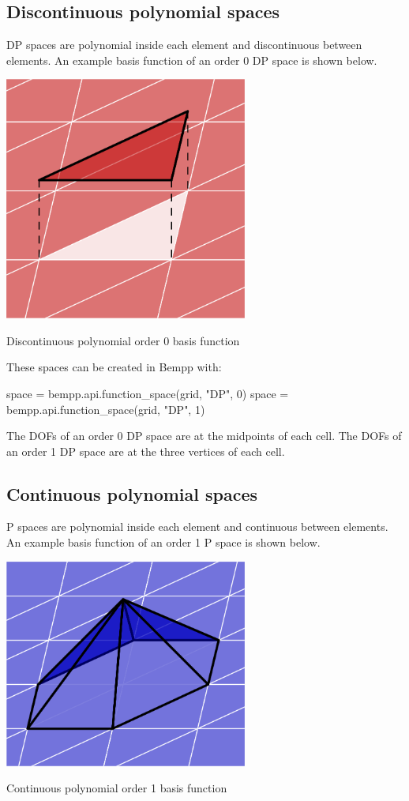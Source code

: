 \documentclass[a4paper]{book}
\begin{document}
\subsection{ Discontinuous polynomial spaces}DP spaces are polynomial inside each element and discontinuous between elements.
An example basis function of an order 0 DP space is shown below.

\begin{center}
\includegraphics[width=0.6\textwidth]{../img/dp0.png}

\footnotesize{Discontinuous polynomial order 0 basis function}\end{center}

These spaces can be created in Bempp with:

\begin{python}
space = bempp.api.function_space(grid, "DP", 0)
space = bempp.api.function_space(grid, "DP", 1)
\end{python}

The DOFs of an order 0 DP space are at the midpoints of each cell.
The DOFs of an order 1 DP space are at the three vertices of each cell.

\subsection{ Continuous polynomial spaces}P spaces are polynomial inside each element and continuous between elements.
An example basis function of an order 1 P space is shown below.

\begin{center}
\includegraphics[width=0.6\textwidth]{../img/p1.png}

\footnotesize{Continuous polynomial order 1 basis function}\end{center}
\end{document}
